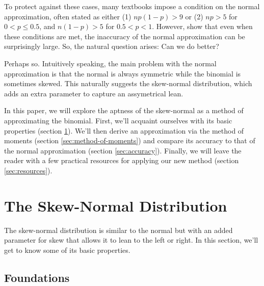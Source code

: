 \documentclass{article}
\begin{document}
To protect against these cases, many textbooks impose a condition on the normal
approximation, often stated as either (1) $np(1-p) > 9$ \; or \; (2) $np > 5$
for $0 < p \leq 0.5$, and $n(1-p) > 5$ for $0.5 < p < 1$. However, \citet{mabs}
show that even when these conditions are met, the inaccuracy of the normal
approximation can be surprisingly large. So, the natural question arises: Can
we do better?

Perhaps so. Intuitively speaking, the main problem with the normal
approximation is that the normal is always symmetric while the binomial is
sometimes skewed. This naturally suggests the skew-normal distribution, which
adds an extra parameter to capture an assymetrical lean.

In this paper, we will explore the aptness of the skew-normal as a method of
approximating the binomial. First, we'll acquaint ourselves with its basic
properties (section \ref{sec:properties}). We'll then derive an approximation
via the method of moments (section \ref{sec:method-of-moments}) and compare its
accuracy to that of the normal approximation (section \ref{sec:accuracy}).
Finally, we will leave the reader with a few practical resources for applying
our new method (section \ref{sec:resources}).

\section{The Skew-Normal Distribution}
\label{sec:properties}

The skew-normal distribution is similar to the normal but with an added
parameter for skew that allows it to lean to the left or right. In this
section, we'll get to know some of its basic properties.

\subsection{Foundations}
\end{document}
